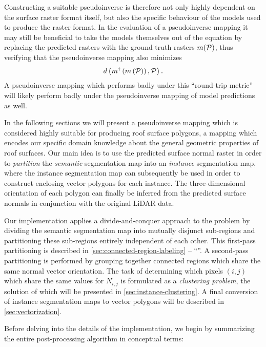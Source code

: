 Constructing a suitable pseudoinverse is therefore not only highly dependent on the surface raster format itself, but also the specific behaviour of the models used to produce the raster format.
In the evaluation of a pseudoinverse mapping it may still be beneficial to take the models themselves out of the equation by replacing the predicted rasters with the ground truth rasters $m(\mathcal{P})$, thus verifying that the pseudoinverse mapping also minimizes
\begin{equation*}
  d\left(
    m^{\dagger}\left(m\left(\mathcal{P}\right)\right),
    \mathcal{P}
  \right).
\end{equation*}
A pseudoinverse mapping which performs badly under this \enquote{round-trip metric} will likely perform badly under the pseudoinverse mapping of model predictions as well.
\newpage

In the following sections we will present a pseudoinverse mapping which is considered highly suitable for producing roof surface polygons, a mapping which encodes our specific domain knowledge about the general geometric properties of roof surfaces.
Our main idea is to use the predicted surface normal raster in order to \textit{partition} the \textit{semantic} segmentation map into an \textit{instance} segmentation map, where the instance segmentation map can subsequently be used in order to construct enclosing vector polygons for each instance.
The three-dimensional orientation of each polygon can finally be inferred from the predicted surface normals in conjunction with the original LiDAR data.

Our implementation applies a divide-and-conquer approach to the problem by dividing the semantic segmentation map into mutually disjunct sub-regions and partitioning these sub-regions entirely independent of each other.
This first-pass partitioning is described in \cref{sec:connected-region-labeling} -- \enquote{}.
A second-pass partitioning is performed by grouping together connected regions which share the same normal vector orientation.
The task of determining which pixels $(i, j)$ which share the same values for $N_{i, j}$ is formulated as a \textit{clustering problem}, the solution of which will be presented in \cref{sec:instance-clustering}.
A final conversion of instance segmentation maps to vector polygons will be described in \cref{sec:vectorization}.

Before delving into the details of the implementation, we begin by summarizing the entire post-processing algorithm in conceptual terms:

